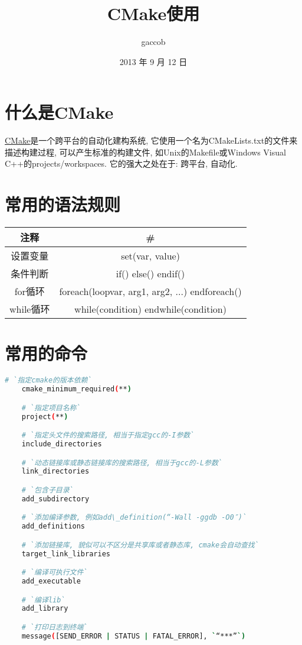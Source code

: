 
\title {\ZHH \huge CMake使用}
\author {\small gaccob}
\date {\small 2013 年 9 月 12 日}
\maketitle

\section{\ZHH 什么是CMake}{
{\href{http://www.cmake.org/cmake/help/v2.8.11/cmake.html}{CMake}是一个跨平台的自动化建构系统, 它使用一个名为CMakeLists.txt的文件来描述构建过程, 可以产生标准的构建文件, 如Unix的Makefile或Windows Visual C++的projects/workspaces. 它的强大之处在于: 跨平台, 自动化. }\par
}

\section{\ZHH 常用的语法规则}{
\begin {table} [htbp]
\centering
\begin {tabular} {| c | c |}
    \hline
    注释        &   \#   \\
    \hline
    设置变量    &   set(var, value) \\
    \hline
    条件判断    &   if() else() endif() \\
    \hline
    for循环     &   foreach(loopvar, arg1, arg2, ...) endforeach() \\
    \hline
    while循环   &   while(condition) endwhile(condition)\\
    \hline
\end {tabular}
\end {table}
}

\section{\ZHH 常用的命令}{
\begin{lstlisting}[language=bash]
    # `指定cmake的版本依赖`
    cmake_minimum_required(**)

    # `指定项目名称`
    project(**)

    # `指定头文件的搜索路径, 相当于指定gcc的-I参数`
    include_directories

    # `动态链接库或静态链接库的搜索路径, 相当于gcc的-L参数`
    link_directories

    # `包含子目录`
    add_subdirectory

    # `添加编译参数, 例如add\_definition(“-Wall -ggdb -O0″)`
    add_definitions

    # `添加链接库, 貌似可以不区分是共享库或者静态库, cmake会自动查找`
    target_link_libraries

    # `编译可执行文件`
    add_executable

    # `编译lib`
    add_library

    # `打印日志到终端`
    message([SEND_ERROR | STATUS | FATAL_ERROR], `“***”`)
\end{lstlisting}
}

